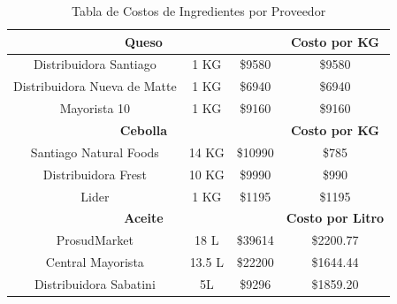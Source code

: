 \documentclass[12pt]{article}
\begin{document}
\begin{table}[H]
\begin{tabular}{|| c | c | c | c||}
        \multicolumn{3}{||c|}{\textbf{Queso}} & \textbf{Costo por KG} \\ [0.5ex] \hline \hline %
        Distribuidora Santiago & 1 KG & \$9580 & \$9580 \\ \hline
        Distribuidora Nueva de Matte & 1 KG & \$6940 & \$6940 \\ \hline
        Mayorista 10 & 1 KG & \$9160 & \$9160 \\ [1ex] \hline \hline

        \multicolumn{3}{||c|}{\textbf{Cebolla}} & \textbf{Costo por KG} \\ [0.5ex] \hline \hline %
        Santiago Natural Foods & 14 KG & \$10990 & \$785 \\ \hline
        Distribuidora Frest & 10 KG & \$9990 & \$990 \\ \hline
        Lider & 1 KG & \$1195 & \$1195 \\ [1ex] \hline \hline

        \multicolumn{3}{||c|}{\textbf{Aceite}} & \textbf{Costo por Litro} \\ [0.5ex] \hline \hline
        ProsudMarket & 18 L & \$39614 & \$2200.77 \\ \hline
        Central Mayorista & 13.5 L & \$22200 & \$1644.44 \\ \hline
        Distribuidora Sabatini & 5L & \$9296 & \$1859.20 \\ [1ex] \hline \hline

    \end{tabular}
    \caption{Tabla de Costos de Ingredientes por Proveedor}
    \label{tab:costos_ingredientes_proveedor}
\end{table} %
\newpage
\end{document}
